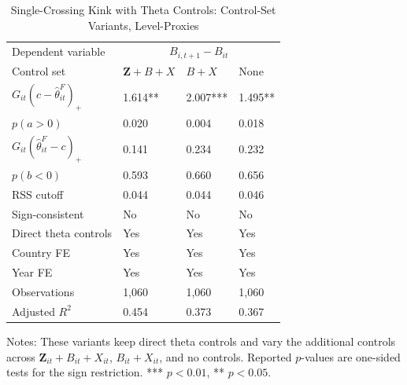 \begin{table}[H]\centering
\caption{Single-Crossing Kink with Theta Controls: Control-Set Variants, Level-Proxies}
\label{tab:appc_kink_withtheta_controls}
\begin{threeparttable}
\scriptsize
\setlength{\tabcolsep}{3.0pt}
\begin{tabularx}{0.92\textwidth}{lYYY}
\toprule
Dependent variable &  \\
Control set & $\mathbf{Z}+B+X$ & $B+X$ & None \\
\midrule
$G_{it}(c-\widehat\theta^F_{it})_+$ & 1.614** & 2.007*** & 1.495** \\
$p(a>0)$ & 0.020 & 0.004 & 0.018 \\
$G_{it}(\widehat\theta^F_{it}-c)_+$ & 0.141 & 0.234 & 0.232 \\
$p(b<0)$ & 0.593 & 0.660 & 0.656 \\
\midrule
RSS cutoff & 0.044 & 0.044 & 0.046 \\
Sign-consistent & No & No & No \\
Direct theta controls & Yes & Yes & Yes \\
Country FE & Yes & Yes & Yes \\
Year FE & Yes & Yes & Yes \\
Observations & 1,060 & 1,060 & 1,060 \\
Adjusted $R^2$ & 0.454 & 0.373 & 0.367 \\
\bottomrule
\end{tabularx}
\begin{tablenotes}[flushleft]\footnotesize
\item Notes: These variants keep direct theta controls and vary the additional controls across $\mathbf{Z}_{it}+B_{it}+X_{it}$, $B_{it}+X_{it}$, and no controls. Reported $p$-values are one-sided tests for the sign restriction. *** $p<0.01$, ** $p<0.05$.
\end{tablenotes}
\end{threeparttable}
\end{table}
